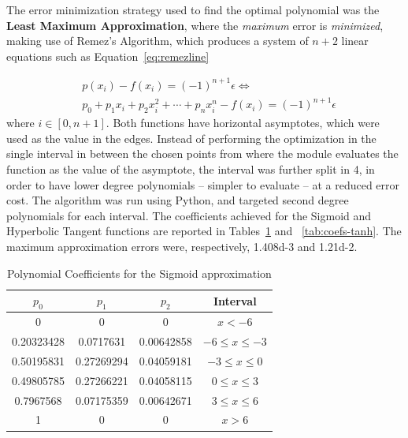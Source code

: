 \documentclass[conference]{IEEEtran}
\begin{document}
The error minimization strategy used to find the optimal polynomial was the \textbf{Least Maximum Approximation}, where
the \emph{maximum} error is \emph{minimized}, making use of Remez's Algorithm, which produces a system of $n+2$ linear equations such as Equation~\ref{eq:remezline}

\begin{eqnarray}\label{eq:remezline}
    & p(x_i) - f(x_i) = (-1)^{n+1} \epsilon \Leftrightarrow  \nonumber \\
		& p_0 + p_1 x_i + p_2 x_i^2 + \cdots + p_n x_i^n - f(x_i) = (-1)^{n+1} \epsilon
\end{eqnarray}
where $i \in \left[0, n+1\right]$. Both functions have horizontal asymptotes, which were used as the value in the edges.
Instead of performing the optimization in the single interval in between the chosen points from where the module evaluates the function
as the value of the asymptote, the interval was further split in 4, in order to have lower degree polynomials -- simpler to evaluate -- at a reduced error cost.
The algorithm was run using Python, and targeted second degree polynomials for each interval. The coefficients achieved for the Sigmoid and Hyperbolic Tangent functions
are reported in Tables~\ref{tab:coefs-sigm} and ~\ref{tab:coefs-tanh}. The maximum approximation errors were, respectively, \num{1.408d-3} and \num{1.21d-2}.

\begin{table}
	\caption{Polynomial Coefficients for the Sigmoid approximation}
	\label{tab:coefs-sigm}
    \centering
  \begin{tabular}{ | c | c | c | c | }
    \hline
    $p_0$      &  $p_1$     &  $p_2$        &  Interval  \\
		\hline
    0          & 0          &  0             & $x < -6$ \\
    \hline
    0.20323428 & 0.0717631  & 0.00642858     & $-6 \leq x \leq -3$ \\
    \hline
		0.50195831 & 0.27269294 & 0.04059181     & $-3 \leq  x \leq 0$ \\
		\hline
		0.49805785 & 0.27266221 & 0.04058115     &  $0 \leq  x \leq 3$ \\
		\hline
		0.7967568 & 0.07175359 & 0.00642671      & $3 \leq  x \leq 6$ \\
		\hline
		1         &  0         &   0             & $x > 6$ \\
		\hline
  \end{tabular}
\end{table}
\end{document}
